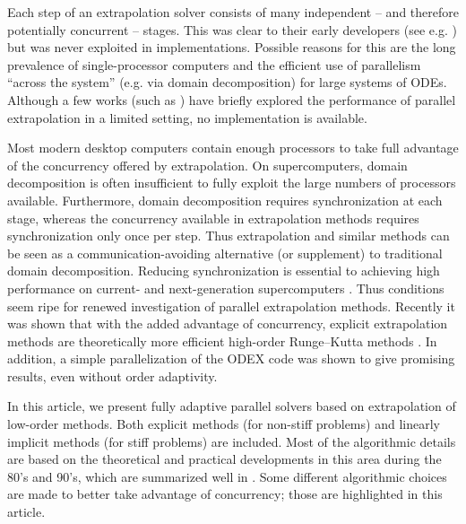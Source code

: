 \documentclass[12pt]{article}
\begin{document}
Each step of an extrapolation solver consists
of many independent -- and therefore potentially concurrent --
stages.  This was clear to their early developers 
(see e.g. \cite{Deuflhard1985}) but was never exploited
in implementations.  Possible reasons for this are
the long prevalence of single-processor computers
and the efficient use of parallelism ``across the system''
(e.g. via domain decomposition) for large systems of ODEs.
Although a few works (such as \cite{Korch2011}) have briefly explored the performance of
parallel extrapolation in a limited setting, no
implementation is available.

Most modern desktop computers contain enough
processors to take full advantage of the concurrency offered by extrapolation.  On supercomputers, domain decomposition is often insufficient
to fully exploit the large numbers of processors available.  Furthermore, domain decomposition
requires synchronization at each stage, whereas the concurrency
available in extrapolation methods requires synchronization
only once per step.  Thus extrapolation and similar methods
can be seen as a communication-avoiding alternative (or supplement)
to traditional domain decomposition.  Reducing synchronization
is essential to achieving high performance on current- and
next-generation supercomputers \cite{rude2016research}.
Thus conditions seem ripe for 
renewed investigation of parallel extrapolation methods.
Recently it was shown that with the added
advantage of concurrency, explicit extrapolation methods 
are theoretically more
efficient high-order Runge--Kutta methods \cite{2014_hork}.
In addition, a simple parallelization of the ODEX code
was shown to give promising results, even without
order adaptivity.

In this article, we present fully adaptive parallel
solvers based on extrapolation of low-order
methods.  Both explicit methods (for non-stiff problems)
and linearly implicit methods (for stiff problems) are included.
Most of the algorithmic details are based on
the theoretical and practical developments
in this area during the 80's and 90's, which are
summarized well in \cite{hairer1993,Hairer:ODEs2}.
Some different algorithmic choices are made to better
take advantage of concurrency;
those are highlighted in this article.
\end{document}
